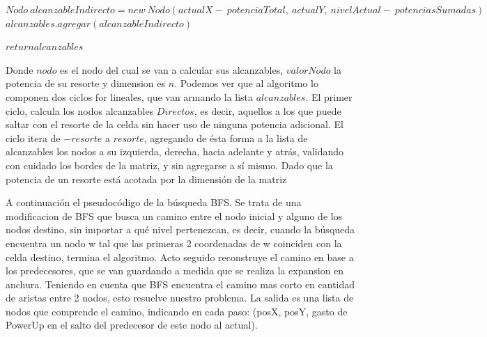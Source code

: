 \begin{algorithmic}[1]
				\State $Nodo\: alcanzableIndirecto = new\: Nodo(actualX  -\: potenciaTotal,\: actualY, \:nivelActual - \:potenciasSumadas)$
				\State $alcanzables.agregar(alcanzableIndirecto)$
			\EndIf

		\EndFor	
		\State $return alcanzables$
\vspace{2mm}
\EndProcedure
\end{algorithmic}

\vspace{2mm}

Donde $nodo$ es el nodo del cual se van a calcular sus alcanzables, $valorNodo$ la potencia de su resorte y dimension es $n$. Podemos ver que al algoritmo lo componen dos ciclos for lineales, que van armando la lista $alcanzables$. El primer ciclo, calcula los nodos alcanzables $Directos$, es decir, aquellos a los que puede saltar con el resorte de la celda sin hacer uso de ninguna potencia adicional. El ciclo itera de $-resorte$ a $resorte$, agregando de \'esta forma a la lista de alcanzables los nodos a su izquierda, derecha, hacia adelante y atr\'as, validando con cuidado los bordes de la matriz, y sin agregarse a s\'i mismo. Dado que la potencia de un resorte est\'a acotada por la dimensi\'on de la matriz

A continuaci\'on el pseudoc\'odigo de la b\'usqueda BFS. Se trata de una modificacion de BFS que busca un camino entre el nodo inicial y alguno de los nodos destino, sin importar a qu\'e nivel pertenezcan, es decir, cuando la b\'usqueda encuentra un nodo w tal que las primeras 2 coordenadas de w coinciden con la celda destino, termina el algoritmo. Acto seguido reconstruye el camino en base a los predecesores, que se van guardando a medida que se realiza la expansion en anchura. Teniendo en cuenta que BFS encuentra el camino mas corto en cantidad de aristas entre 2 nodos, esto resuelve nuestro problema. La salida es una lista de nodos que comprende el camino, indicando en cada paso: (posX, posY, gasto de PowerUp en el salto del predecesor de este nodo al actual).

